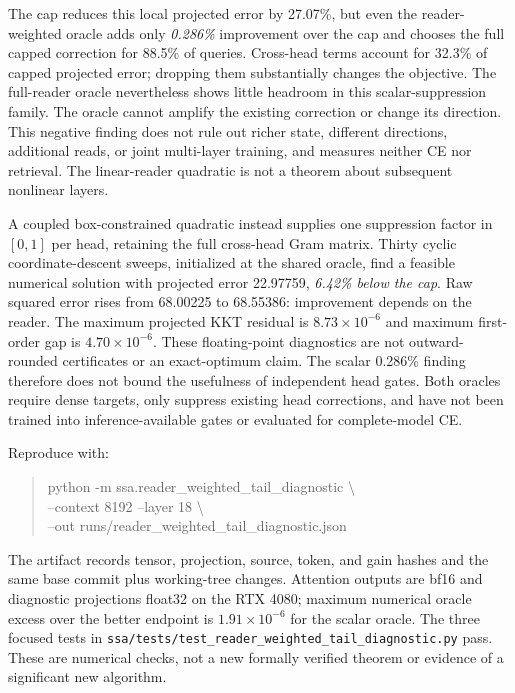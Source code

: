 \documentclass[11pt]{article}
\numberwithin{equation}{section}
\begin{document}
The cap reduces this local projected error by 27.07\%, but even the reader-weighted oracle adds only
\emph{0.286\%} improvement over the cap and chooses the full capped correction for 88.5\% of queries.
Cross-head terms account for 32.3\% of capped projected error; dropping them substantially changes the
objective. The full-reader oracle nevertheless shows little headroom in this scalar-suppression family. The oracle
cannot amplify the existing correction or change its direction. This negative finding does not rule out
richer state, different directions, additional reads, or joint multi-layer training, and measures neither
CE nor retrieval. The linear-reader quadratic is not a theorem about subsequent nonlinear layers.

A coupled box-constrained quadratic instead supplies one suppression factor in $[0,1]$ per head,
retaining the full cross-head Gram matrix. Thirty cyclic coordinate-descent sweeps, initialized at the
shared oracle, find a feasible numerical solution with projected error 22.97759, \emph{6.42\% below the cap}.
Raw squared error rises from 68.00225 to 68.55386: improvement depends on the reader. The maximum
projected KKT residual is $8.73\times10^{-6}$ and maximum first-order gap is $4.70\times10^{-6}$.
These floating-point diagnostics are not outward-rounded certificates or an exact-optimum claim.
The scalar 0.286\% finding therefore does not bound the usefulness of independent head gates. Both
oracles require dense targets, only suppress existing head corrections, and have not been trained into
inference-available gates or evaluated for complete-model CE.

Reproduce with:
\begin{quote}\small\ttfamily\raggedright
python -m ssa.reader\_weighted\_tail\_diagnostic \textbackslash{}\\
--context 8192 --layer 18 \textbackslash{}\\
--out runs/reader\_weighted\_tail\_diagnostic.json
\end{quote}
The artifact records tensor, projection, source, token, and gain hashes and the same base commit plus
working-tree changes. Attention outputs are bf16 and diagnostic projections float32 on the RTX 4080;
maximum numerical oracle excess over the better endpoint is $1.91\times10^{-6}$ for the scalar oracle. The three focused tests in
\nolinkurl{ssa/tests/test_reader_weighted_tail_diagnostic.py} pass. These are numerical checks, not a new
formally verified theorem or evidence of a significant new algorithm.
\end{document}
